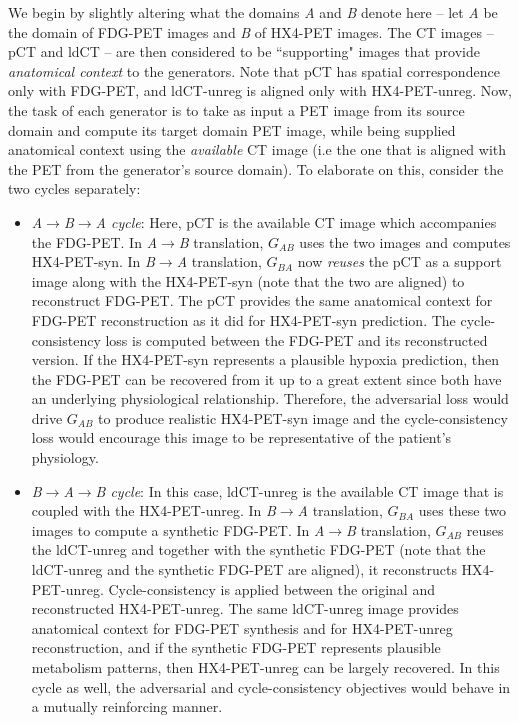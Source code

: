 We begin by slightly altering what the domains \textit{A} and \textit{B} denote here -- let \textit{A} be the domain of FDG-PET images and \textit{B} of HX4-PET images. The CT images -- pCT and ldCT -- are then considered to be ``supporting" images that provide \textit{anatomical context} to the generators. Note that pCT has spatial correspondence only with FDG-PET, and ldCT-unreg is aligned only with HX4-PET-unreg. Now, the task of each generator is to take as input a PET image from its source domain and compute its target domain PET image, while being supplied anatomical context using the \textit{available} CT image (i.e the one that is aligned with the PET from the generator's source domain). To elaborate on this, consider the two cycles separately: 

\begin{itemize}
    \item \textit{A$\rightarrow$B$\rightarrow$A cycle}: Here, pCT is the available CT image which accompanies the FDG-PET. In \textit{A}$\rightarrow$\textit{B} translation, $G_{AB}$ uses the two images and computes HX4-PET-syn. In \textit{B}$\rightarrow$\textit{A} translation, $G_{BA}$ now \textit{reuses} the pCT as a support image along with the HX4-PET-syn (note that the two are aligned) to reconstruct FDG-PET. The pCT provides the same anatomical context for FDG-PET reconstruction as it did for HX4-PET-syn prediction. The cycle-consistency loss is computed between the FDG-PET and its reconstructed version. If the HX4-PET-syn represents a plausible hypoxia prediction, then the FDG-PET can be recovered from it up to a great extent since both have an underlying physiological relationship. Therefore, the adversarial loss would drive $G_{AB}$ to produce realistic HX4-PET-syn image and the cycle-consistency loss would encourage this image to be representative of the patient's physiology. 
    
    \item \textit{B$\rightarrow$A$\rightarrow$B cycle}: In this case, ldCT-unreg is the available CT image that is coupled with the HX4-PET-unreg. In \textit{B}$\rightarrow$\textit{A} translation, $G_{BA}$ uses these two images to compute a synthetic FDG-PET. In \textit{A}$\rightarrow$\textit{B} translation, $G_{AB}$ reuses the ldCT-unreg and together with the synthetic FDG-PET (note that the ldCT-unreg and the synthetic FDG-PET are aligned), it reconstructs HX4-PET-unreg. Cycle-consistency is applied between the original and reconstructed HX4-PET-unreg. The same ldCT-unreg image provides anatomical context for FDG-PET synthesis and for HX4-PET-unreg reconstruction, and if the synthetic FDG-PET represents plausible metabolism patterns, then HX4-PET-unreg can be largely recovered. In this cycle as well, the adversarial and cycle-consistency objectives would behave in a mutually reinforcing manner.
\end{itemize}

